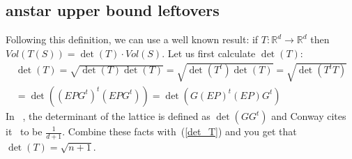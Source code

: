 \subsection{anstar upper bound leftovers}

Following this definition, we can use a well known result: if $T:\mathbb{R}^d\rightarrow\mathbb{R}^d$ then \\ ${Vol(T(S))=\det(T)\cdot Vol(S)}$. Let us first calculate $\det(T)$:
\begin{align}
    \det(T) = \sqrt{\det(T)\det(T)} = \sqrt{\det(T^t)\det(T)} =\sqrt{\det(T^tT)} \nonumber \\ \label{det_T}
    = \det((EPG^t)^t(EPG^t)) = \det(G(EP)^t(EP)G^t)
\end{align}
 In ~\cite{conway2013sphere}, the determinant of the lattice is defined as $\det(GG^t)$ and Conway cites it~\cite{conway2013sphere} to be $\frac{1}{d+1}$. Combine these facts with~(\ref{det_T}) and you get that $\det(T)=\sqrt{n+1}$. 


